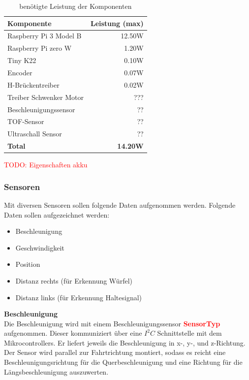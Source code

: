 \documentclass[../../main.tex]{subfiles}
\begin{document}
    \begin{table}[H] \centering
        \begin{tabular}{|l|r|}
        \hline
        \textbf{Komponente}     & \textbf{Leistung (max)} \\ \hline
        Raspberry Pi 3 Model B  & 12.50W                  \\ \hline
        Raspberry Pi zero W     & 1.20W                   \\ \hline
        Tiny K22                & 0.10W                   \\ \hline
        Encoder                 & 0.07W                   \\ \hline
        H-Brückentreiber        & 0.02W                   \\ \hline
        Treiber Schwenker Motor & ???                     \\ \hline
        Beschleunigungssensor   & ??                      \\ \hline
        TOF-Sensor              & ??                      \\ \hline
        Ultraschall Sensor      & ??                      \\ \hline
        \textbf{Total}          & \textbf{14.20W}         \\ \hline
        \end{tabular}
        \caption{benötigte Leistung der Komponenten}
        \label{tab:et_komponente_leistung}
    \end{table}

    \textcolor{red}{TODO: Eigenschaften akku}

    \subsubsection{Sensoren}
    Mit diversen Sensoren sollen folgende Daten aufgenommen werden. Folgende Daten sollen aufgezeichnet werden:
    \begin{itemize}
        \item Beschleunigung
        \item Geschwindigkeit
        \item Position
        \item Distanz rechts (für Erkennung Würfel)
        \item Distanz links (für Erkennung Haltesignal)
    \end{itemize}


    \textbf{Beschleunigung}\\
    Die Beschleunigung wird mit einem Beschleunigungssensor \textcolor{red}{\textbf{SensorTyp}} aufgenommen. Dieser kommuniziert über eine $I^2C$ Schnittstelle mit dem Mikrocontrollers. Er liefert jeweils die Beschleunigung in x-, y-, und z-Richtung. Der Sensor wird parallel zur Fahrtrichtung montiert, sodass es reicht eine Beschleunigungsrichtung für die Querbeschleunigung und eine Richtung für die Längsbeschleunigung auszuwerten.\\
\end{document}
